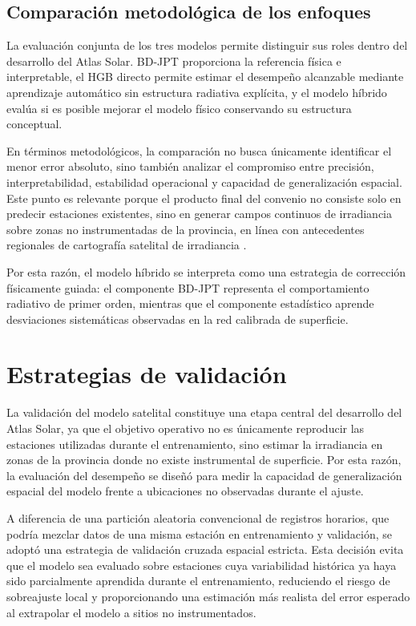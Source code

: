 \documentclass[../main.tex]{subfiles}
\begin{document}
\subsection{Comparación metodológica de los enfoques}

La evaluación conjunta de los tres modelos permite distinguir sus roles dentro del desarrollo del Atlas Solar. BD-JPT proporciona la referencia física e interpretable, el HGB directo permite estimar el desempeño alcanzable mediante aprendizaje automático sin estructura radiativa explícita, y el modelo híbrido evalúa si es posible mejorar el modelo físico conservando su estructura conceptual.

En términos metodológicos, la comparación no busca únicamente identificar el menor error absoluto, sino también analizar el compromiso entre precisión, interpretabilidad, estabilidad operacional y capacidad de generalización espacial. Este punto es relevante porque el producto final del convenio no consiste solo en predecir estaciones existentes, sino en generar campos continuos de irradiancia sobre zonas no instrumentadas de la provincia, en línea con antecedentes regionales de cartografía satelital de irradiancia \cite{alonsosuarez2014}.

Por esta razón, el modelo híbrido se interpreta como una estrategia de corrección físicamente guiada: el componente BD-JPT representa el comportamiento radiativo de primer orden, mientras que el componente estadístico aprende desviaciones sistemáticas observadas en la red calibrada de superficie.


\section{Estrategias de validación}

La validación del modelo satelital constituye una etapa central del desarrollo del Atlas Solar, ya que el objetivo operativo no es únicamente reproducir las estaciones utilizadas durante el entrenamiento, sino estimar la irradiancia en zonas de la provincia donde no existe instrumental de superficie. Por esta razón, la evaluación del desempeño se diseñó para medir la capacidad de generalización espacial del modelo frente a ubicaciones no observadas durante el ajuste.

A diferencia de una partición aleatoria convencional de registros horarios, que podría mezclar datos de una misma estación en entrenamiento y validación, se adoptó una estrategia de validación cruzada espacial estricta. Esta decisión evita que el modelo sea evaluado sobre estaciones cuya variabilidad histórica ya haya sido parcialmente aprendida durante el entrenamiento, reduciendo el riesgo de sobreajuste local y proporcionando una estimación más realista del error esperado al extrapolar el modelo a sitios no instrumentados.
\end{document}
